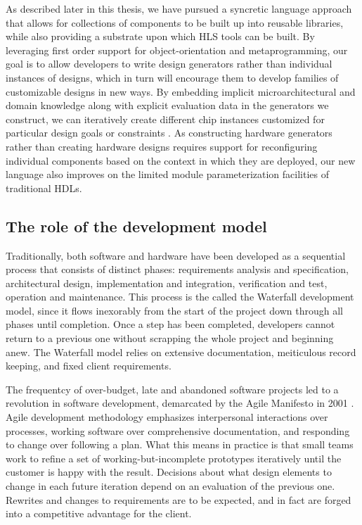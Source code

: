 As described later in this thesis, we have pursued a syncretic language approach that allows for collections of components to be built up into reusable libraries, while also providing a substrate upon which HLS tools can be built.
By leveraging first order support for object-orientation and metaprogramming, 
our goal is to allow developers to write design generators rather than individual instances of designs,
which in turn will encourage them to develop families of customizable designs in new ways.
By embedding implicit microarchitectural and domain knowledge along with explicit evaluation data in the generators we construct, we can iteratively create different chip instances customized for particular design goals or constraints \cite{shacham-micro10}.
As constructing hardware generators rather than creating hardware designs requires
support for reconfiguring individual components based on the context in which they are deployed,
our new language also improves on the limited module parameterization facilities of traditional HDLs.

\subsection{The role of the development model}

Traditionally, both software and hardware have been developed as a sequential process that consists of distinct phases:
requirements analysis and specification,
architectural design,
implementation and integration,
verification and test,
operation and maintenance.
This process is the called the Waterfall development model, since it flows inexorably from the start of the project down through all phases until completion. 
Once a step has been completed, developers cannot return to a previous one without scrapping the whole project and beginning anew.
The Waterfall model relies on extensive documentation, meiticulous record keeping, and fixed client requirements.

The frequentcy of over-budget, late and abandoned software projects led to a revolution in software development, demarcated by the Agile Manifesto in 2001 \cite{agile}.
Agile development methodology emphasizes interpersonal interactions over processes, working software over comprehensive documentation, and responding to change over following a plan.
What this means in practice is that small teams work to refine a set of working-but-incomplete prototypes iteratively until the customer is happy with the result.
Decisions about what design elements to change in each future iteration depend on an evaluation of the previous one.
Rewrites and changes to requirements are to be expected, and in fact are forged into a competitive advantage for the client.

